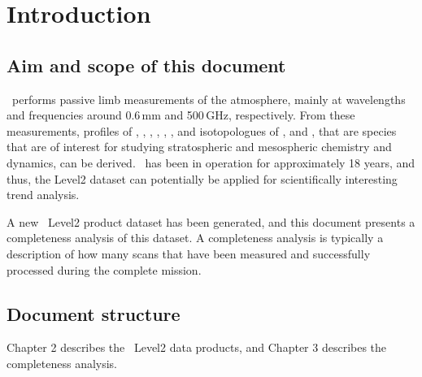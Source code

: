 \chapter{Introduction}
\label{chapter:introduction}


\setcounter{page}{1}


\section{Aim and scope of this document}
\label{sec:aim}
\smr\ performs passive limb measurements of the atmosphere,
mainly at wavelengths and frequencies around 0.6\,mm and 500\,GHz,
respectively.
From these measurements, profiles of 
, , , , 
, , and isotopologues of , and ,
that are species that are of interest for studying stratospheric and 
mesospheric chemistry and dynamics, can be derived. 
\smr\ has been in operation for approximately 18 years, and thus, the Level2
dataset can potentially be applied for scientifically interesting trend analysis.

A new \smr\ Level2 product dataset has been generated, and this document
presents a completeness analysis of this dataset. A completeness analysis
is typically a description of how many scans that have been measured
and successfully processed during the complete mission.

\section{Document structure}

Chapter 2 describes the \smr\ Level2 data products,
and Chapter 3 describes the completeness analysis.
